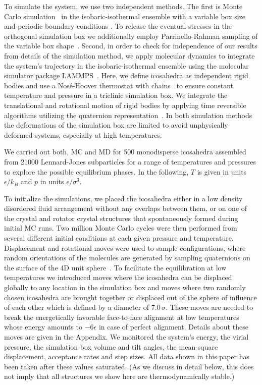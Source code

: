 \documentclass[10pt,aps,pre,twocolumn,superscriptaddress,amsmath,amssymb]{revtex4-1}
\begin{document}
To simulate the system, we use two independent methods. The first is Monte Carlo simulation~\cite{Metropolis1953} in the isobaric-isothermal ensemble with a variable box size and periodic boundary conditions \cite{Wood1968,Wood1970}.
To release the eventual stresses in the orthogonal simulation box we additionally employ Parrinello-Rahman sampling of the variable box shape~\cite{Parrinello1980,Parrinello1981,Najafabadi1983,Yashonath1985,Filion2009}.
Second, in order to check for independence of our results from details of the simulation method, we apply molecular dynamics to integrate the system's trajectory in the isobaric-isothermal ensemble using the molecular simulator package LAMMPS~\cite{Plimpton1995}.
Here, we define icosahedra as independent rigid bodies and use a Nosé-Hoover thermostat with chains~\cite{Martyna1992} to ensure constant temperature and pressure in a triclinic simulation box.
We integrate the translational and rotational motion of rigid bodies by applying time reversible algorithms utilizing the quaternion representation~\cite{Kamberaj2005}.
In both simulation methods the deformations of the simulation box are limited to avoid unphysically deformed systems, especially at high temperatures.

We carried out both, MC and MD for 500 monodisperse icosahedra assembled from 21000 Lennard-Jones subparticles for a range of temperatures and pressures to explore the possible equilibrium phases. In the following, $T$ is given in units $\epsilon/k_B$ and $p$ in units $\epsilon/\sigma^3$.


To initialize the simulations, we placed the icosahedra either in a low density disordered fluid arrangement without any overlaps between them, or on one of the crystal and rotator crystal structures that spontaneously formed during initial MC runs.
Two million Monte Carlo cycles were then performed from several different initial conditions at each given pressure and temperature.
Displacement and rotational moves were used to sample configurations, where random orientations of the molecules are generated by sampling quaternions on the surface of the 4D unit sphere~\cite{Vesely1982}.
%
To facilitate the equilibration at low temperatures we introduced moves where the icosahedra can be displaced globally to any location in the simulation box and moves where two randomly chosen icosahedra are brought together or displaced out of the sphere of influence of each other which is defined by a diameter of $7.0\,\sigma$.
These moves are needed to break the energetically favorable face-to-face alignment at low temperatures whose energy amounts to $-6\epsilon$ in case of perfect alignment.
Details about these moves are given in the Appendix.
We monitored the system's energy, the virial pressure, the simulation box volume and tilt angles, the mean-square displacement, acceptance rates and step sizes. All data shown in this paper has been taken after these values saturated. (As we discuss in detail below, this does not imply that all structures we show here are thermodynamically stable.)
\end{document}
